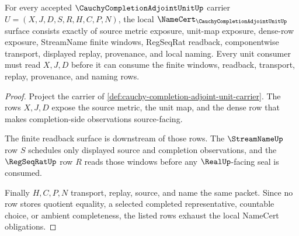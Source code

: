 \begin{theorem}
\label{thm:cauchy-completion-adjoint-unit-namecert-obligations}
For every accepted $\CauchyCompletionAdjointUnitUp$ carrier $U=(X,J,D,S,R,H,C,P,N)$, the local $\NameCert_{\CauchyCompletionAdjointUnitUp}$ surface consists exactly of source metric exposure, unit-map exposure, dense-row exposure, StreamName finite windows, RegSeqRat readback, componentwise transport, displayed replay, provenance, and local naming. Every unit consumer must read $X,J,D$ before it can consume the finite windows, readback, transport, replay, provenance, and naming rows.
\end{theorem}
\begin{proof}
Project the carrier of \autoref{def:cauchy-completion-adjoint-unit-carrier}. The rows $X,J,D$ expose the source metric, the unit map, and the dense row that makes completion-side observations source-facing.

The finite readback surface is downstream of those rows. The $\StreamNameUp$ row $S$ schedules only displayed source and completion observations, and the $\RegSeqRatUp$ row $R$ reads those windows before any $\RealUp$-facing seal is consumed.

Finally $H,C,P,N$ transport, replay, source, and name the same packet. Since no row stores quotient equality, a selected completed representative, countable choice, or ambient completeness, the listed rows exhaust the local NameCert obligations.
\end{proof}

